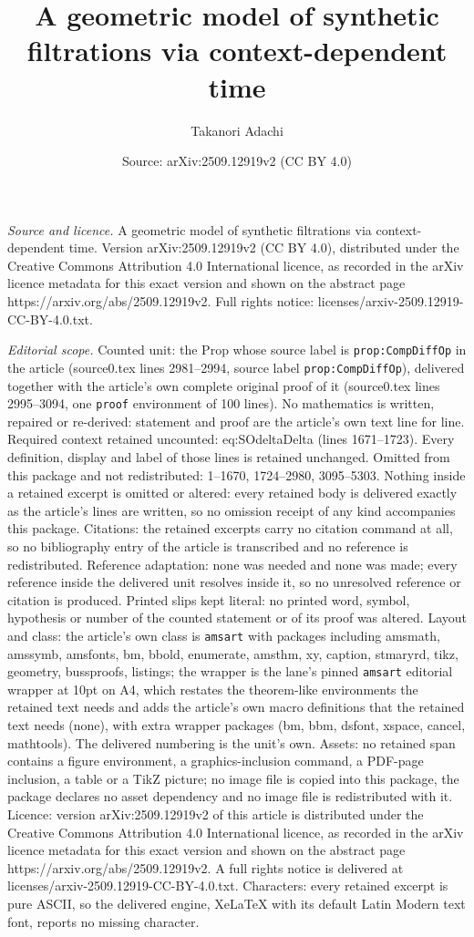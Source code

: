 \documentclass[10pt,a4paper]{amsart}
\title[A geometric model of synthetic filtrations via context-depen]{A geometric model of synthetic filtrations via context-dependent time}
\author{Takanori Adachi}
\date{Source: arXiv:2509.12919v2 (CC BY 4.0)}
\begin{document}
\maketitle

\noindent\emph{Source and licence.} A geometric model of synthetic filtrations via context-dependent time. Version arXiv:2509.12919v2 (CC BY 4.0), distributed under the Creative Commons Attribution 4.0 International licence, as recorded in the arXiv licence metadata for this exact version and shown on the abstract page https://arxiv.org/abs/2509.12919v2. Full rights notice: licenses/arxiv-2509.12919-CC-BY-4.0.txt.\par\smallskip

\noindent\textit{Editorial scope.} Counted unit: the Prop whose source label is \texttt{prop:CompDiffOp} in the article (source0.tex lines 2981--2994, source label \texttt{prop:CompDiffOp}), delivered together with the article's own complete original proof of it (source0.tex lines 2995--3094, one \texttt{proof} environment of 100 lines). No mathematics is written, repaired or re-derived: statement and proof are the article's own text line for line. Required context retained uncounted: eq:SOdeltaDelta (lines 1671--1723). Every definition, display and label of those lines is retained unchanged. Omitted from this package and not redistributed: 1--1670, 1724--2980, 3095--5303. Nothing inside a retained excerpt is omitted or altered: every retained body is delivered exactly as the article's lines are written, so no omission receipt of any kind accompanies this package. Citations: the retained excerpts carry no citation command at all, so no bibliography entry of the article is transcribed and no reference is redistributed. Reference adaptation: none was needed and none was made; every reference inside the delivered unit resolves inside it, so no unresolved reference or citation is produced. Printed slips kept literal: no printed word, symbol, hypothesis or number of the counted statement or of its proof was altered. Layout and class: the article's own class is \texttt{amsart} with packages including amsmath, amssymb, amsfonts, bm, bbold, enumerate, amsthm, xy, caption, stmaryrd, tikz, geometry, bussproofs, listings; the wrapper is the lane's pinned \texttt{amsart} editorial wrapper at 10pt on A4, which restates the theorem-like environments the retained text needs and adds the article's own macro definitions that the retained text needs (none), with extra wrapper packages (bm, bbm, dsfont, xspace, cancel, mathtools). The delivered numbering is the unit's own. Assets: no retained span contains a figure environment, a graphics-inclusion command, a PDF-page inclusion, a table or a TikZ picture; no image file is copied into this package, the package declares no asset dependency and no image file is redistributed with it. Licence: version arXiv:2509.12919v2 of this article is distributed under the Creative Commons Attribution 4.0 International licence, as recorded in the arXiv licence metadata for this exact version and shown on the abstract page https://arxiv.org/abs/2509.12919v2. A full rights notice is delivered at licenses/arxiv-2509.12919-CC-BY-4.0.txt. Characters: every retained excerpt is pure ASCII, so the delivered engine, XeLaTeX with its default Latin Modern text font, reports no missing character.
\end{document}
